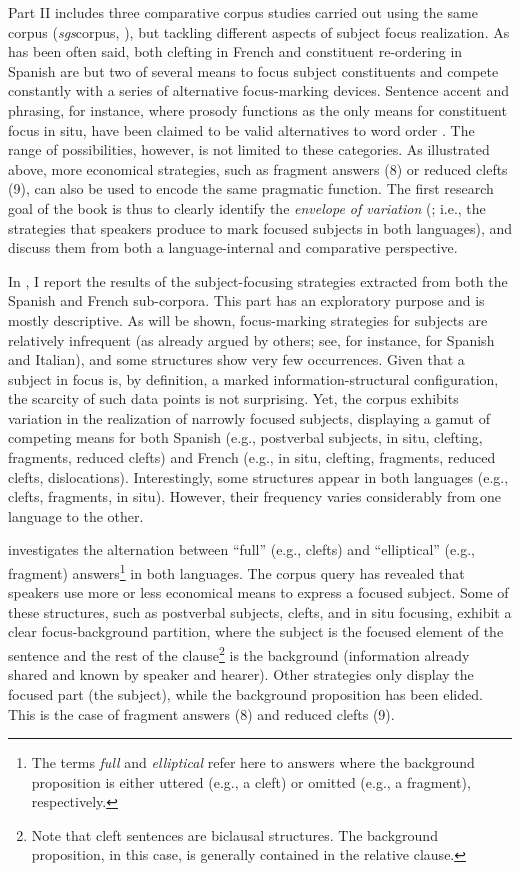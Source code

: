 Part II includes three comparative corpus studies carried out using the same corpus (\textit{sgs}corpus, \cite{adli2011gradient}), but tackling different aspects of subject focus realization. As has been often said, both clefting in French and constituent re-ordering in Spanish are but two of several means to focus subject constituents and compete constantly with a series of alternative focus-marking devices. Sentence accent and phrasing, for instance, where prosody functions as the only means for constituent focus in situ, have been claimed to be valid alternatives to word order \parencite{dufter2009focus}. 
The range of possibilities, however, is not limited to these categories. As illustrated above, more economical strategies, such as fragment answers (8) or reduced clefts (9), can also be used to encode the same pragmatic function. The first research goal of the book is thus to clearly identify the \textit{envelope of variation} (\cite{labov1972sociolinguistic}; i.e., the strategies that speakers produce to mark focused subjects in both languages), and discuss them from both a language-internal and comparative perspective. 

In \textsc{}, I report the results of the subject-focusing strategies extracted from both the Spanish and French sub-corpora. This part has an exploratory purpose and is mostly descriptive. As will be shown, focus-marking strategies for subjects are relatively infrequent (as already argued by others; see, for instance, \cite{brunetti2009italian} for Spanish and Italian), and some structures show very few occurrences. Given that a subject in focus is, by definition, a marked information-structural configuration, the scarcity of such data points is not surprising. Yet, the corpus exhibits variation in the realization of narrowly focused subjects, displaying a gamut of competing means for both Spanish (e.g., postverbal subjects, in situ, clefting, fragments, reduced clefts) and French (e.g., in situ, clefting, fragments, reduced clefts, dislocations). Interestingly, some structures appear in both languages (e.g., clefts, fragments, in situ). However, their frequency varies considerably from one language to the other.

\textsc{} investigates the alternation between ``full” (e.g., clefts) and ``elliptical” (e.g., fragment) answers\footnote{The terms \textit{full} and \textit{elliptical} refer here to answers where the background proposition is either uttered (e.g., a cleft) or omitted (e.g., a fragment), respectively.} in both languages.
The corpus query has revealed that speakers use more or less economical means to express a focused subject. Some of these structures, such as postverbal subjects, clefts, and in situ focusing, exhibit a clear focus-background partition, where the subject is the focused element of the sentence and the rest of the clause\footnote{Note that cleft sentences are biclausal structures. The background proposition, in this case, is generally contained in the relative clause.} is the background (information already shared and known by speaker and hearer). Other strategies only display the focused part (the subject), while the background proposition has been elided. This is the case of fragment answers (8) and reduced clefts (9). 

